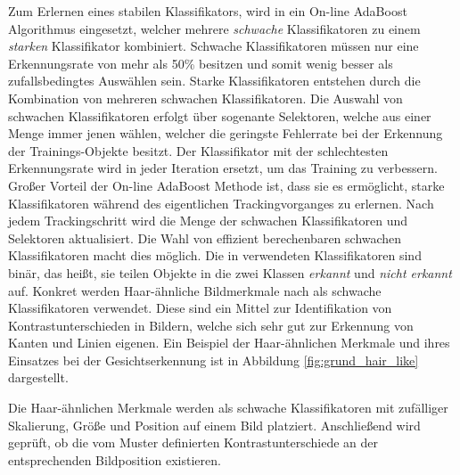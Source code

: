 Zum Erlernen eines stabilen Klassifikators, wird in \cite[]{Grabner} ein On-line AdaBoost Algorithmus eingesetzt,
welcher mehrere \textit{schwache} Klassifikatoren zu einem \textit{starken} Klassifikator kombiniert.
Schwache Klassifikatoren müssen nur eine Erkennungsrate von mehr als 50\% besitzen und somit
wenig besser als zufallsbedingtes Auswählen sein.
Starke Klassifikatoren entstehen durch die Kombination von mehreren schwachen Klassifikatoren.
Die Auswahl von schwachen Klassifikatoren erfolgt über sogenante Selektoren, welche aus einer Menge
immer jenen wählen, welcher die geringste Fehlerrate bei der Erkennung
der Trainings-Objekte besitzt. Der Klassifikator mit der schlechtesten Erkennungsrate wird in jeder
Iteration ersetzt, um das Training zu verbessern.
Großer Vorteil der On-line AdaBoost Methode ist, dass sie es ermöglicht, starke Klassifikatoren während des
eigentlichen Trackingvorganges zu erlernen.
Nach jedem Trackingschritt wird die Menge der schwachen Klassifikatoren und Selektoren aktualisiert. Die Wahl
von effizient berechenbaren schwachen Klassifikatoren macht dies möglich.
Die in \cite[]{Grabner} verwendeten Klassifikatoren sind binär, das heißt,
sie teilen Objekte in die zwei Klassen \textit{erkannt} und \textit{nicht erkannt} auf.
Konkret werden Haar-ähnliche Bildmerkmale nach \cite[]{Viola} als schwache Klassifikatoren verwendet.
Diese sind ein Mittel zur Identifikation von Kontrastunterschieden in Bildern, welche sich sehr gut
zur Erkennung von Kanten und Linien eigenen. Ein Beispiel der Haar-ähnlichen Merkmale und ihres Einsatzes
bei der Gesichtserkennung ist in Abbildung \ref{fig:grund_hair_like} dargestellt.

Die Haar-ähnlichen Merkmale werden als schwache Klassifikatoren mit zufälliger Skalierung, Größe und Position
auf einem Bild platziert. Anschließend wird geprüft, ob die vom Muster definierten Kontrastunterschiede
an der entsprechenden Bildposition existieren.

